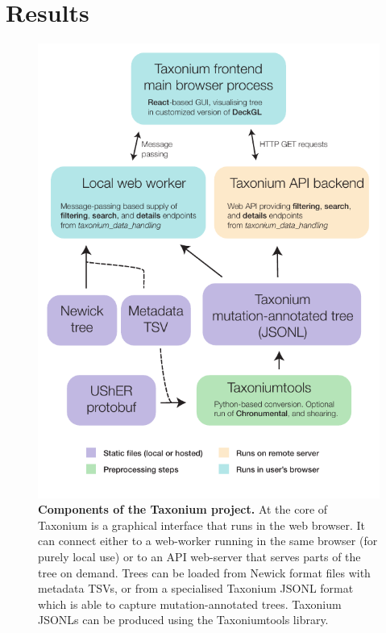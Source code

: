 \section*{Results}\label{s:results}

\begin{figure}

\begin{center}
\includegraphics[width=\linewidth]{Figures/TaxoniumFlowChart.pdf}
\end{center}
\caption{\textbf{Components of the Taxonium project.} At the core of Taxonium is a graphical interface that runs in the web browser. It can connect either to a web-worker running in the same browser (for purely local use) or to an API web-server that serves parts of the tree on demand. Trees can be loaded from Newick format files with metadata TSVs, or from a specialised Taxonium JSONL format which is able to capture mutation-annotated trees. Taxonium JSONLs can be produced using the Taxoniumtools library.}
\label{fig:flowchart}
\end{figure}

